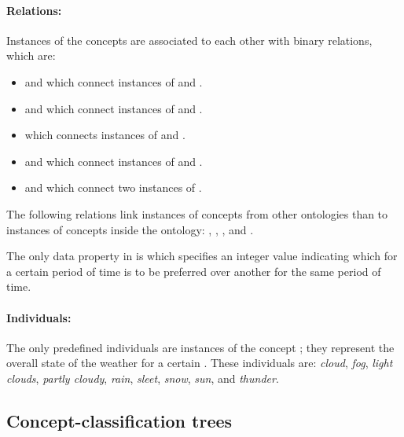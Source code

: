 \paragraph{Relations:}

Instances of the concepts are associated to each other with binary relations, which are:

\begin{itemize}
  \item {} and  which connect instances of  and .
  \item {} and  which connect instances of  and .
  \item {} which connects instances of  and .
  \item {} and  which connect instances of  and .
  \item {} and  which connect two instances of .
\end{itemize}

The following relations link instances of concepts from other ontologies than \smarthomeweather to instances of concepts inside the ontology: , , , and .

The only data property in \smarthomeweather is  which specifies an integer value indicating which  for a certain period of time is to be preferred over another  for the same period of time.

\paragraph{Individuals:}

The only predefined individuals are instances of the concept ; they represent the overall state of the weather for a certain . These individuals are: \emph{cloud}, \emph{fog}, \emph{light clouds}, \emph{partly cloudy}, \emph{rain}, \emph{sleet}, \emph{snow}, \emph{sun}, and \emph{thunder}.

\subsection{Concept-classification trees}
\label{sec:concept_classification_trees}

